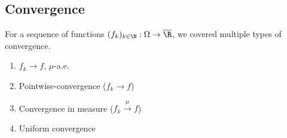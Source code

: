 
\subsection{Convergence}
For a sequence of functions $(f_k)_{k \in \N}: \Omega \to \overline{\R}$, we covered multiple types of convergence.
\begin{enumerate}
  \item $f_k \to f$, $\mu$-a.e.
  \item Pointwise-convergence ($f_k \to f$)
  \item Convergence in measure ($f_k \stackrel{\mu}{\to} f$)
  \item Uniform convergence
\end{enumerate}
